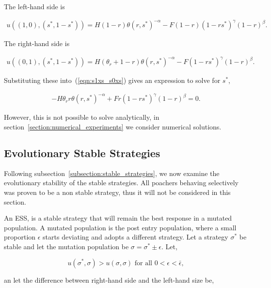 \documentclass[10pt]{article}
\begin{document}
The left-hand side is

\begin{eqnarray} \nonumber
u((1, 0),(s^*, 1 - s^*)) =
H(1 - r) \theta(r, s^*)^{-\alpha} - F (1 - r)(1 - rs^*)^{\gamma}(1 - r)^{\beta} .
\end{eqnarray}

The right-hand side is

\begin{eqnarray} \nonumber
u((0, 1),(s^*, 1 - s^*)) =
H(\theta_r + 1 - r)\theta(r, s^*)^{-\alpha} - F(1 - rs^*)^{\gamma}(1 - r)^{\beta} .
\end{eqnarray}

Substituting these into~(\ref{eqn:s1xs_s0xs}) gives an expression to solve for \(s^*\),

\begin{eqnarray}
\label{eqn:stablemixed}
- H \theta_r r \theta(r, s^*)^{-\alpha}  + F r (1 - rs^*)^{\gamma}(1 - r)^{\beta} = 0.
\end{eqnarray}

However, this is not possible to solve analytically, in section~\ref{section:numerical_experiments}
we consider numerical solutions.

\subsection{Evolutionary Stable Strategies}\label{subsection:evolutionary_stable_strategies}

Following subsection~\ref{subsection:stable_strategies}, we now examine the evolutionary
stability of the stable strategies. All poachers behaving selectively was proven to be a non stable
strategy, thus it will not be considered in this section.  

An ESS, is a stable strategy that will remain the best response in a mutated population.
A mutated population  is the post entry population, where a small proportion
\(\epsilon\) starts deviating and adopts a different strategy.  Let a strategy 
\(\sigma^*\) be stable and let the mutation population be \(\sigma = \sigma^*
\pm \epsilon\).  Let, 

\begin{equation}\label{eqn:evolutionary_stability}
	u(\sigma^*, \sigma) > u(\sigma, \sigma)  \mbox{ for all }  0 < \epsilon < \bar{\epsilon},
\end{equation}

an let the difference between right-hand side and the left-hand size be, 
\end{document}
